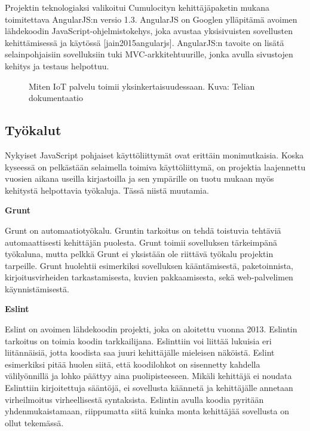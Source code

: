 \documentclass{tktltiki}
\begin{document}
Projektin teknologiaksi valikoitui Cumulocityn kehittäjäpaketin mukana toimitettava AngularJS:n versio 1.3. AngularJS on Googlen ylläpitämä avoimen lähdekoodin JavaScript-ohjelmistokehys, joka avustaa yksisivuisten sovellusten kehittämisessä ja käytössä [jain2015angularjs]. AngularJS:n tavoite on lisätä selainpohjaisiin sovelluksiin tuki MVC-arkkitehtuurille, jonka avulla sivustojen kehitys ja testaus helpottuu. 

\begin{figure}[h]
\begin{center}
\caption{Miten IoT palvelu toimii yksinkertaisuudessaan. Kuva: Telian dokumentaatio}
\label{IoT arkkitehtuuri}
\end{center}
\end{figure}

\subsection{Työkalut}

Nykyiset JavaScript pohjaiset käyttöliittymät ovat erittäin monimutkaisia. Koska kyseessä on pelkästään selaimella toimiva käyttöliittymä, on projektia laajennettu vuosien aikana useilla kirjastoilla ja sen ympärille on tuotu mukaan myös kehitystä helpottavia työkaluja. Tässä niistä muutamia. 




\textbf{Grunt}

Grunt on automaatiotyökalu. Gruntin tarkoitus on tehdä toistuvia tehtäviä automaattisesti kehittäjän puolesta. Grunt toimii sovelluksen tärkeimpänä työkaluna, mutta pelkkä Grunt ei yksistään ole riittävä työkalu projektin tarpeille. Grunt huolehtii esimerkiksi sovelluksen kääntämisestä, paketoinnista, kirjoitusvirheiden tarkastamisesta, kuvien pakkaamisesta, sekä web-palvelimen käynnistämisestä. 

\textbf{Eslint}

Eslint on avoimen lähdekoodin projekti, joka on aloitettu vuonna 2013. Eslintin tarkoitus on toimia koodin tarkkailijana. Eslinttiin voi liittää lukuisia eri liitännäisiä, jotta koodista saa juuri kehittäjälle mieleisen näköistä. Eslint esimerkiksi pitää huolen siitä, että koodilohkot on sisennetty kahdella välilyönnillä ja lohko päättyy aina puolipisteeseen. Mikäli kehittäjä ei noudata Eslinttiin kirjoitettuja sääntöjä, ei sovellusta käännetä ja kehittäjälle annetaan virheilmoitus virheellisestä syntaksista. Eslintin avulla koodia pyritään yhdenmukaistamaan, riippumatta siitä kuinka monta kehittäjää sovellusta on ollut tekemässä. 
\end{document}
